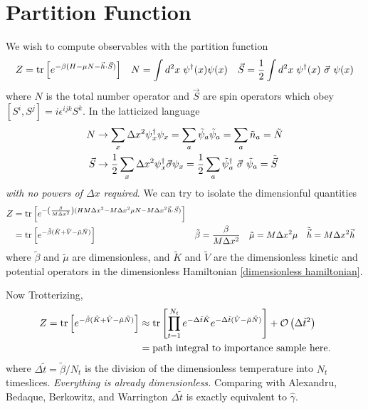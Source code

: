 \section{Partition Function}

We wish to compute observables with the partition function
\begin{align}
	Z
	&=
	\text{tr}\left[e^{-\beta(H-\mu N - \vec{h}\cdot\vec{S})}\right]
	&
	N &= \int d^2x\; \psi{}^{\dagger}(x)\psi(x)
	&
	\vec{S} = \frac{1}{2} \int d^2x\; \psi{}^{\dagger}(x) ~ \vec{\sigma} ~ \psi(x)
\end{align}
where $N$ is the total number operator and $\vec{S}$ are spin operators which obey $[S^i, S^j] = i\epsilon^{ijk} S^k$.
In the latticized language 
\begin{align}
	N
	&\rightarrow
	\sum_x \Delta x^2 \psi{}^{\dagger}_x \psi_x
	=
	\sum_a \tilde{\psi}_a \tilde{\psi}_a
	=
	\sum_a \tilde{n}_a
	=
	\tilde{N}
	\\
	\vec{S}
	&\rightarrow
	\frac{1}{2} \sum_x \Delta x^2 \psi{}^{\dagger}_x \vec{\sigma} \psi_x
	=
	\frac{1}{2} \sum_a \tilde{\psi}{}^{\dagger}_a ~ \vec{\sigma} ~ \tilde{\psi}_a
	=
	\tilde{\vec{S}}
\end{align}
\emph{with no powers of $\Delta x$ required}.
We can try to isolate the dimensionful quantities
\begin{align}
	Z
	&=
	\text{tr}\left[e^{-\left(\frac{\beta}{M\Delta x^2}\right)(HM\Delta x^2 -M \Delta x^2 \mu N - M \Delta x^2 \vec{h} \cdot \vec{S})}\right]
\\
	&=
	\text{tr}\left[e^{-\tilde{\beta}(\tilde{K}+\tilde{V}-\tilde{\mu} \tilde{N})}\right]
	&
	\tilde{\beta} &= \frac{\beta}{M \Delta x^2}
	&
	\tilde{\mu}   &= M \Delta x^2 \mu
	&
	\tilde{\vec{h}} &= M \Delta x^2 \vec{h}
\end{align}
where $\tilde{\beta}$ and $\tilde{\mu}$ are dimensionless, and $\tilde{K}$ and $\tilde{V}$ are the dimensionless kinetic and potential operators in the dimensionless Hamiltonian \eqref{dimensionless hamiltonian}.

Now Trotterizing,
\begin{align}
	Z
	=
	\text{tr}\left[e^{-\tilde{\beta}(\tilde{K}+\tilde{V}-\tilde{\mu} \tilde{N})}\right]
	&\approx
	\text{tr}\left[\prod_{t=1}^{N_t} e^{-\Delta \tilde{t} \tilde{K}} e^{-\Delta\tilde{t}(\tilde{V}-\tilde{\mu}\tilde{N})}\right] + \mathcal{O}\left(\Delta\tilde{t}^2\right)
	\\
	&=
	\textrm{path integral to importance sample here.}
\end{align}
where $\Delta\tilde{t} = \tilde{\beta}/N_t$ is the division of the dimensionless temperature into $N_t$ timeslices.
\emph{Everything is already dimensionless.}
Comparing with Alexandru, Bedaque, Berkowitz, and Warrington $\Delta\tilde{t}$ is exactly equivalent to $\hat{\gamma}$.

